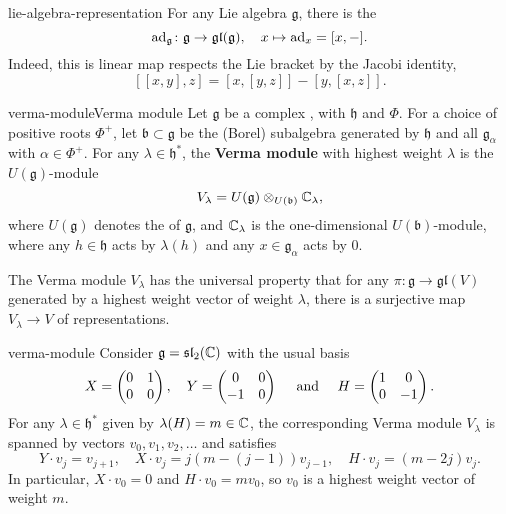 \begin{example}{lie-algebra-representation}
    For any Lie algebra $\mathfrak{g}$, there is the 
    \[ \textup{ad}_\mathfrak{g} \colon \mathfrak{g} \to \mathfrak{gl}(\mathfrak{g}), \quad x \mapsto \textup{ad}_x = [x, -] . \]
    Indeed, this is linear map respects the Lie bracket by the Jacobi identity,
    \[ [[x, y], z] = [x, [y, z]] - [y, [x, z]] . \]
\end{example}

\begin{topic}{verma-module}{Verma module}
    Let $\mathfrak{g}$ be a complex , with  $\mathfrak{h}$ and  $\Phi$. For a choice of positive roots $\Phi^+$, let $\mathfrak{b} \subset \mathfrak{g}$ be the (Borel) subalgebra generated by $\mathfrak{h}$ and all $\mathfrak{g}_\alpha$ with $\alpha \in \Phi^+$. For any $\lambda \in \mathfrak{h}^*$, the \textbf{Verma module} with highest weight $\lambda$ is the $U(\mathfrak{g})$-module
    \[ V_\lambda = U(\mathfrak{g}) \otimes_{U(\mathfrak{b})} \mathbb{C}_\lambda , \]
    where $U(\mathfrak{g})$ denotes the  of $\mathfrak{g}$, and $\mathbb{C}_\lambda$ is the one-dimensional $U(\mathfrak{b})$-module, where any $h \in \mathfrak{h}$ acts by $\lambda(h)$ and any $x \in \mathfrak{g}_\alpha$ acts by $0$.
    
    The Verma module $V_\lambda$ has the universal property that for any  $\pi \colon \mathfrak{g} \to \mathfrak{gl}(V)$ generated by a highest weight vector of weight $\lambda$, there is a surjective map $V_\lambda \to V$ of representations.
\end{topic}

\begin{example}{verma-module}
    Consider $\mathfrak{g} = \mathfrak{sl}_2(\mathbb{C})$ with the usual basis
    \[ X = \begin{pmatrix} 0 & 1 \\ 0 & 0 \end{pmatrix}, \quad Y = \begin{pmatrix} 0 & 0 \\ -1 & 0 \end{pmatrix} \quad \textup{ and } \quad H = \begin{pmatrix} 1 & 0 \\ 0 & -1 \end{pmatrix} . \]
    For any $\lambda \in \mathfrak{h}^*$ given by $\lambda(H) = m \in \mathbb{C}$, the corresponding Verma module $V_\lambda$ is spanned by vectors $v_0, v_1, v_2, \ldots$ and satisfies
    \[ Y \cdot v_j = v_{j + 1}, \quad X \cdot v_j = j(m - (j - 1)) v_{j - 1}, \quad H \cdot v_j = (m - 2j) v_j . \]
    In particular, $X \cdot v_0 = 0$ and $H \cdot v_0 = m v_0$, so $v_0$ is a highest weight vector of weight $m$.
\end{example}


